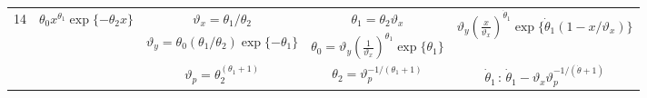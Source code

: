 \begin{tabular*}{\textwidth}{@{\extracolsep{\fill}}ccccc}
\multirow{3}{*}{14} &
\multirow{3}{*}{$\theta_0 x^{\theta_1}\exp\{-\theta_2 x\}$} &
$\displaystyle\vartheta_x = \theta_1/\theta_2$ &
$\displaystyle\theta_1 = \theta_2\vartheta_x$ &
\multirow{2}{*}{$\displaystyle \vartheta_y\left(\frac{x}{\vartheta_x}\right)^{\dot{\theta}_1}\exp\{\dot{\theta}_1(1-x/\vartheta_x)\} $}\tabularnewline
 & 
 &
$\displaystyle\vartheta_y = \theta_0(\theta_1/\theta_2)\exp\{-\theta_1\}$ &
$\displaystyle\theta_0 = \vartheta_y\left(\frac{1}{\vartheta_x}\right)^{\theta_1}\exp\{\theta_1\}$
 & \tabularnewline
 &
 &
$\displaystyle\vartheta_p = \theta_2^{(\theta_1+1)}$ &
$\displaystyle\theta_2 = \vartheta_p^{-1/(\theta_1+1)}$ &
 $\dot{\theta}_1\, : \, \dot{\theta}_1 - \vartheta_x \vartheta_p^{-1/(\dot{\theta}+1)}$ \tabularnewline
\hline 
\end{tabular*}


